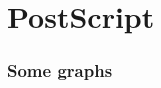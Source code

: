 \documentclass[zihao=-4,linespread=1.5,heading=true,a4paper,twoside]{ctexart}
\begin{document}
\newpage\part{PostScript}
\section{Some graphs}


%

%

%

%


%

%

%
\end{document}
